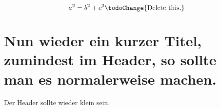 \begin{equation}
	a^2=b^2+c^2 \textrm{\todoChange{Delete this.}}
\end{equation}

\newpage\TUMStandardAreaMain%
\chapter[Nun wieder ein kurzer Titel.]{Nun wieder ein kurzer Titel, zumindest im Header, so sollte man es normalerweise machen.}\label{chap:Nun wieder ein kurzer Titel}%
Der Header sollte wieder klein sein. \lipsum[1-30]%


